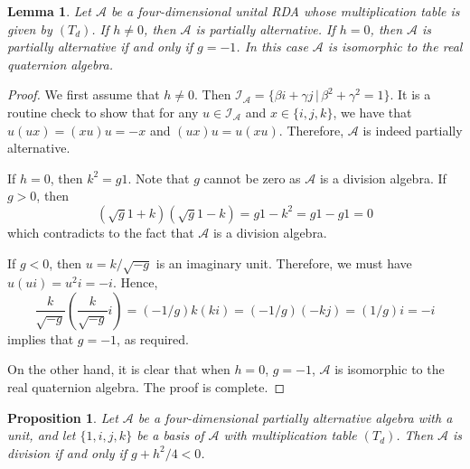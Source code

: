 \documentclass{amsart}
\theoremstyle{definition}
\theoremstyle{plain}
\newtheorem{lemma}{Lemma}
\newtheorem{proposition}{Proposition}
\begin{document}
\begin{lemma}
Let $\mathcal A$ be a four-dimensional  unital RDA  whose multiplication table is given by $(T_d)$.  If $h\neq 0$, then $\mathcal A$ is partially alternative.
 If $h=0$, then $\mathcal A$ is partially alternative if and only if $g=-1$. In this case $\mathcal A$ is isomorphic to the real quaternion algebra.
\end{lemma}
\begin{proof}
We first assume that $h\neq 0$. Then $\mathcal I_{\mathcal A} = \{ \beta i + \gamma j \,|\, \beta^2 +\gamma^2 = 1\}$. It is a routine check to show that 
for any $u\in \mathcal I_{\mathcal A}$ and $x\in \{i, j, k \}$, we have that $u(ux) =  (xu)u = -x$ and $(ux) u = u(xu)$. Therefore, $\mathcal A$ is indeed  partially 
alternative.

If $h=0$, then $k^2 = g1$. Note that $g$ cannot be zero as $\mathcal A$ is a division algebra. If $g>0$, then 
$$ (\sqrt{g} 1 + k) (\sqrt{g} 1 - k) = g1 - k^2 = g1 - g1 =0$$ which contradicts to the fact that $\mathcal A$ is a division algebra.

If $g<0$, then $u = k/\sqrt{-g}$ is an imaginary unit. Therefore, we must have $u(u i) = u^2 i =-i$. Hence, 
$$ \dfrac{k}{\sqrt{-g}} \left(\dfrac{k}{\sqrt{-g}} i\right) = (-1/g) k(ki) =  (-1/g) (-kj) = (1/g) i =-i$$ implies that $g=-1$, as required. 

On the other hand, it is clear that when $h=0$, $g=-1$, $\mathcal A$ is isomorphic to the real quaternion algebra. The proof is complete.
\end{proof}




\begin{proposition}\label{prop}
Let $\mathcal A$ be a four-dimensional partially alternative algebra with a unit, and let  $\{1, i, j, k\}$ be a basis of $\mathcal A$ with multiplication table $(T_d)$. Then 
$\mathcal A$ is division if and only if $g+h^2/4 < 0$.

\end{proposition}
\end{document}
